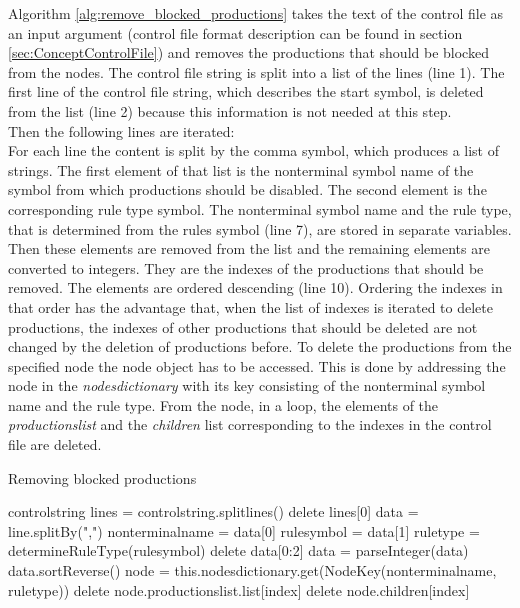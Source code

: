 Algorithm \ref{alg:remove_blocked_productions} takes the text of the control file as an input argument (control file format description can be found in section \ref{sec:ConceptControlFile}) and removes the productions that should be blocked from the nodes.  
The control file string is split into a list of the lines (line 1).
The first line of the control file string, which describes the start symbol, is deleted from the list (line 2) because this information is not needed at this step.\\
Then the following lines are iterated:\\
For each line the content is split by the comma symbol, which produces a list of strings.
The first element of that list is the nonterminal symbol name of the symbol from which productions should be disabled.
The second element is the corresponding rule type symbol.
The nonterminal symbol name and the rule type, that is determined from the rules symbol (line 7), are stored in separate variables.
Then these elements are removed from the list and the remaining elements are converted to integers.
They are the indexes of the productions that should be removed.
The elements are ordered descending (line 10).
Ordering the indexes in that order has the advantage that, when the list of indexes is iterated to delete productions, the indexes of other productions that should be deleted are not changed by the deletion of productions before. To delete the productions from the specified node the node object has to be accessed.
This is done by addressing the node in the \textit{nodes\textunderscore dictionary} with its key consisting of the nonterminal symbol name and the rule type.
From the node, in a loop, the elements of the \textit{productions\textunderscore list} and the \textit{children} list corresponding to the indexes in the control file are deleted.

\begin{algorithm}[H]
\caption{Removing blocked productions}
\begin{algorithmic}[1] 
\Require control\textunderscore string
\State lines = control\textunderscore string.splitlines()
\State delete lines[0]
	\State data = line.splitBy(",")
	\State nonterminal\textunderscore name = data[0] 
	\State rule\textunderscore symbol = data[1]
	\State rule\textunderscore type = determineRuleType(rule\textunderscore symbol)
	\State delete data[0:2]
	\State data = parseInteger(data)
	\State data.sortReverse()
	\State node = this.nodes\textunderscore dictionary.get(Node\textunderscore Key(nonterminal\textunderscore name, rule\textunderscore type))
		\State delete node.productions\textunderscore list.list[index]
		\State delete node.children[index]
	\EndFor
\EndFor
\end{algorithmic}
\label{alg:remove_blocked_productions}
\end{algorithm}

